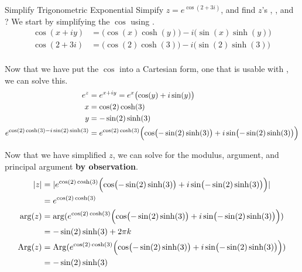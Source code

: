 \begin{example}[Lecture 3]{Simplify Trigonometric Exponential}
  Simpify $z = e^{\cos(2 + 3i)}$, and find $z$'s , , and ?
  \tcblower{}
  We start by simplifying the $\cos$ using .
  \begin{align*}
    \cos(x + iy) &= \bigl( \cos(x) \cosh(y) \bigr) - i \bigl( \sin(x) \sinh(y) \bigr) \\
    \cos(2 + 3i) &= \bigl( \cos(2) \cosh(3) \bigr) - i \bigl( \sin(2) \sinh(3) \bigr) \\
  \end{align*}

  Now that we have put the $\cos$ into a Cartesian form, one that is usable with , we can solve this.
  \begin{align*}
    e^{z} &= e^{x + iy} = e^{x} \bigl( \cos(y) + i \sin(y) \bigr) \\
    x &= \cos(2) \cosh(3) \\
    y &= -\sin(2) \sinh(3) \\
    e^{\cos(2) \cosh(3) - i \sin(2) \sinh(3)} &= e^{\cos(2) \cosh(3)} \Bigl( \cos \bigl( -\sin(2) \sinh(3) \bigr) + i \sin \bigl( -\sin(2) \sinh(3) \bigr) \Bigr)
  \end{align*}

  Now that we have simplified $z$, we can solve for the modulus, argument, and principal argument \textbf{by observation}.
  \begin{align*}
    \lvert z \rvert &= \lvert e^{\cos(2) \cosh(3)} \Bigl( \cos \bigl( -\sin(2) \sinh(3) \bigr) + i \sin \bigl( -\sin(2) \sinh(3) \bigr) \Bigr) \rvert \\
                &= e^{\cos(2) \cosh(3)} \\
    \arg(z) &= \arg(e^{\cos(2) \cosh(3)} \Bigl( \cos \bigl( -\sin(2) \sinh(3) \bigr) + i \sin \bigl( -\sin(2) \sinh(3) \bigr) \Bigr)) \\
                &= -\sin(2) \sinh(3) + 2\pi k \\
    \operatorname{Arg}(z) &= \operatorname{Arg}(e^{\cos(2) \cosh(3)} \Bigl( \cos \bigl( -\sin(2) \sinh(3) \bigr) + i \sin \bigl( -\sin(2) \sinh(3) \bigr) \Bigr)) \\
                &= -\sin(2) \sinh(3) \\
  \end{align*}
\end{example}


